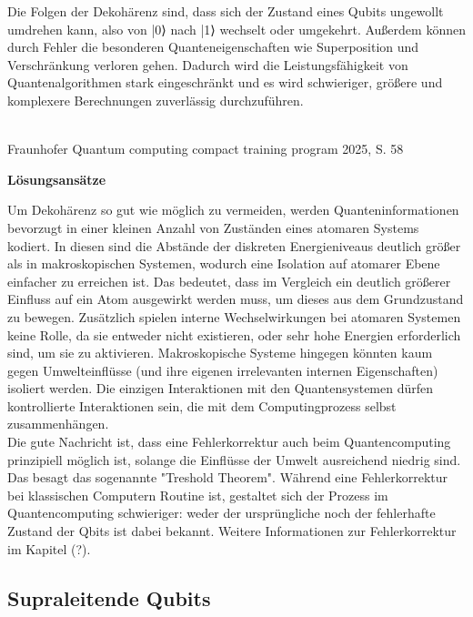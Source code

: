 \cite{mermin_quantum_2012}

Die Folgen der Dekohärenz sind, dass sich der Zustand eines Qubits ungewollt umdrehen kann, also von |0⟩ nach |1⟩ wechselt oder umgekehrt. Außerdem können durch Fehler die besonderen Quanteneigenschaften wie Superposition und Verschränkung verloren gehen. Dadurch wird die Leistungsfähigkeit von Quantenalgorithmen stark eingeschränkt und es wird schwieriger, größere und komplexere Berechnungen zuverlässig durchzuführen.

\cite{nielsen_quantum_2010}\\
Fraunhofer Quantum computing compact training program 2025, S. 58 

\textbf{Lösungsansätze }

Um Dekohärenz so gut wie möglich zu vermeiden, werden Quanteninformationen bevorzugt in einer kleinen Anzahl von Zuständen eines atomaren Systems kodiert. In diesen sind die Abstände der diskreten Energieniveaus deutlich größer als in makroskopischen Systemen, wodurch eine  Isolation auf atomarer Ebene einfacher zu erreichen ist. Das bedeutet, dass im Vergleich ein deutlich größerer Einfluss auf ein Atom ausgewirkt werden muss, um dieses aus dem Grundzustand zu bewegen. Zusätzlich spielen interne Wechselwirkungen bei atomaren Systemen keine Rolle, da sie entweder nicht existieren, oder sehr hohe Energien erforderlich sind, um sie zu aktivieren.
Makroskopische Systeme hingegen könnten kaum gegen Umwelteinflüsse (und ihre eigenen irrelevanten internen Eigenschaften) isoliert werden. Die einzigen Interaktionen mit den Quantensystemen dürfen kontrollierte Interaktionen sein, die mit dem Computingprozess selbst zusammenhängen. \\

Die gute Nachricht ist, dass eine Fehlerkorrektur auch beim Quantencomputing prinzipiell möglich ist, solange die Einflüsse der Umwelt ausreichend niedrig sind. Das besagt das sogenannte "Treshold Theorem". Während eine Fehlerkorrektur bei klassischen Computern Routine ist, gestaltet sich der Prozess im Quantencomputing schwieriger: weder der ursprüngliche noch der fehlerhafte Zustand der Qbits ist dabei bekannt. 
Weitere Informationen zur Fehlerkorrektur im Kapitel (?). \\
 
\cite{mermin_quantum_2012}

\subsection{Supraleitende Qubits }
\label{subsec: Supraleitende Qubits}

